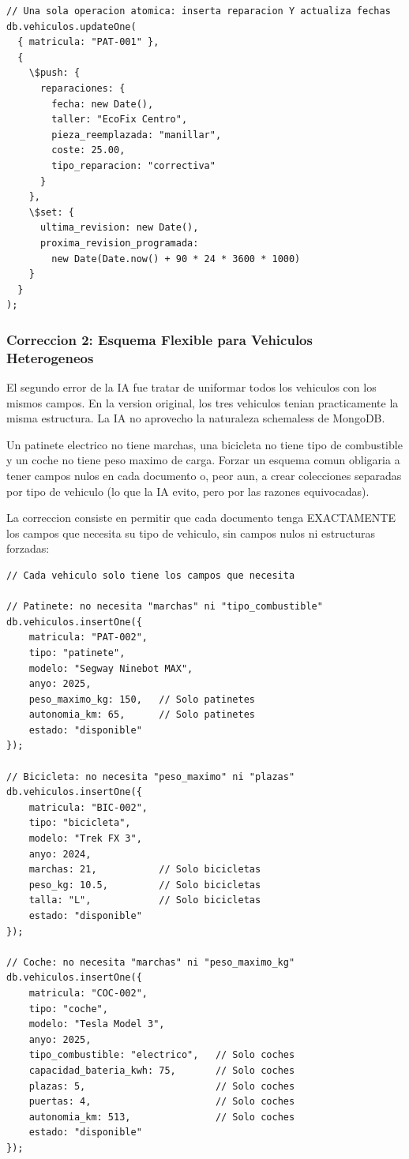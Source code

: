 \begin{lstlisting}[caption=Operacion atomica sobre el agregado completo]
// Una sola operacion atomica: inserta reparacion Y actualiza fechas
db.vehiculos.updateOne(
  { matricula: "PAT-001" },
  {
    \$push: {
      reparaciones: {
        fecha: new Date(),
        taller: "EcoFix Centro",
        pieza_reemplazada: "manillar",
        coste: 25.00,
        tipo_reparacion: "correctiva"
      }
    },
    \$set: {
      ultima_revision: new Date(),
      proxima_revision_programada:
        new Date(Date.now() + 90 * 24 * 3600 * 1000)
    }
  }
);
\end{lstlisting}

\subsubsection{Correccion 2: Esquema Flexible para Vehiculos Heterogeneos}

El segundo error de la IA fue tratar de uniformar todos los vehiculos con los mismos campos. En la version original, los tres vehiculos tenian practicamente la misma estructura. La IA no aprovecho la naturaleza schemaless de MongoDB.

Un patinete electrico no tiene marchas, una bicicleta no tiene tipo de combustible y un coche no tiene peso maximo de carga. Forzar un esquema comun obligaria a tener campos nulos en cada documento o, peor aun, a crear colecciones separadas por tipo de vehiculo (lo que la IA evito, pero por las razones equivocadas).

La correccion consiste en permitir que cada documento tenga EXACTAMENTE los campos que necesita su tipo de vehiculo, sin campos nulos ni estructuras forzadas:

\begin{lstlisting}[caption=Correccion 2: esquema flexible por tipo de vehiculo]
// Cada vehiculo solo tiene los campos que necesita

// Patinete: no necesita "marchas" ni "tipo_combustible"
db.vehiculos.insertOne({
    matricula: "PAT-002",
    tipo: "patinete",
    modelo: "Segway Ninebot MAX",
    anyo: 2025,
    peso_maximo_kg: 150,   // Solo patinetes
    autonomia_km: 65,      // Solo patinetes
    estado: "disponible"
});

// Bicicleta: no necesita "peso_maximo" ni "plazas"
db.vehiculos.insertOne({
    matricula: "BIC-002",
    tipo: "bicicleta",
    modelo: "Trek FX 3",
    anyo: 2024,
    marchas: 21,           // Solo bicicletas
    peso_kg: 10.5,         // Solo bicicletas
    talla: "L",            // Solo bicicletas
    estado: "disponible"
});

// Coche: no necesita "marchas" ni "peso_maximo_kg"
db.vehiculos.insertOne({
    matricula: "COC-002",
    tipo: "coche",
    modelo: "Tesla Model 3",
    anyo: 2025,
    tipo_combustible: "electrico",   // Solo coches
    capacidad_bateria_kwh: 75,       // Solo coches
    plazas: 5,                       // Solo coches
    puertas: 4,                      // Solo coches
    autonomia_km: 513,               // Solo coches
    estado: "disponible"
});
\end{lstlisting}

